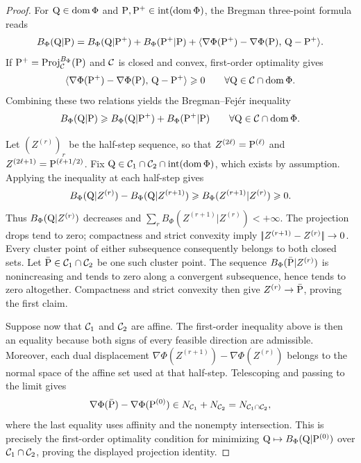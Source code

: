 \begin{proof}
	For $\Q\in\operatorname{dom}\Phi$ and $\P,\P^+\in\operatorname{int}(\operatorname{dom}\Phi)$, the Bregman three-point formula reads
	\[
		B_\Phi(\Q|\P)
		=
		B_\Phi(\Q|\P^+)
		+
		B_\Phi(\P^+|\P)
		+
		\dotp{\nabla\Phi(\P^+)-\nabla\Phi(\P)}{\Q-\P^+}.
	\]
	If $\P^+=\Proj_\Cc^{B_\Phi}(\P)$ and $\Cc$ is closed and convex, first-order optimality gives
	\[
		\dotp{\nabla\Phi(\P^+)-\nabla\Phi(\P)}{\Q-\P^+}\geq0
		\qquad \forall \Q\in\Cc\cap\operatorname{dom}\Phi.
	\]
	Combining these two relations yields the Bregman--Fej\'er inequality
	\[
		B_\Phi(\Q|\P)
		\geq
		B_\Phi(\Q|\P^+)+B_\Phi(\P^+|\P)
		\qquad\forall \Q\in\Cc\cap\operatorname{dom}\Phi.
	\]

	Let $(Z^{(r)})_r$ be the half-step sequence, so that $Z^{(2\ell)}=\P^{(\ell)}$ and $Z^{(2\ell+1)}=\P^{(\ell+1/2)}$. Fix $\Q\in\Cc_1\cap\Cc_2\cap\operatorname{int}(\operatorname{dom}\Phi)$, which exists by assumption. Applying the inequality at each half-step gives
	\[
		B_\Phi(\Q|Z^{(r)})-B_\Phi(\Q|Z^{(r+1)})
		\geq
		B_\Phi(Z^{(r+1)}|Z^{(r)})\geq0.
	\]
	Thus $B_\Phi(\Q|Z^{(r)})$ decreases and $\sum_r B_\Phi(Z^{(r+1)}|Z^{(r)})<+\infty$. The projection drops tend to zero; compactness and strict convexity imply $\norm{Z^{(r+1)}-Z^{(r)}}\to0$. Every cluster point of either subsequence consequently belongs to both closed sets. Let $\bar\P\in\Cc_1\cap\Cc_2$ be one such cluster point. The sequence $B_\Phi(\bar\P|Z^{(r)})$ is nonincreasing and tends to zero along a convergent subsequence, hence tends to zero altogether. Compactness and strict convexity then give $Z^{(r)}\to\bar\P$, proving the first claim.

	Suppose now that $\Cc_1$ and $\Cc_2$ are affine. The first-order inequality above is then an equality because both signs of every feasible direction are admissible. Moreover, each dual displacement
	\(\nabla\Phi(Z^{(r+1)})-\nabla\Phi(Z^{(r)})\)
	belongs to the normal space of the affine set used at that half-step. Telescoping and passing to the limit gives
	\[
		\nabla\Phi(\bar \P)-\nabla\Phi(\P^{(0)})
		\in
		N_{\Cc_1}+N_{\Cc_2}
		=
		N_{\Cc_1\cap\Cc_2},
	\]
	where the last equality uses affinity and the nonempty intersection. This is precisely the first-order optimality condition for minimizing $\Q\mapsto B_\Phi(\Q|\P^{(0)})$ over $\Cc_1\cap\Cc_2$, proving the displayed projection identity.
\end{proof}


